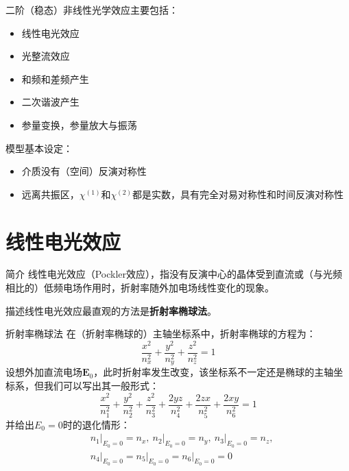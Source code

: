 \documentclass{beamer}
\renewcommand{\bm}{\symbf}
\newenvironment{slide}{
    \begin{frame}{\bfseries{\sectiontitle}}
}{
    \end{frame}
}
\let\sectiononly\section
\renewcommand{\section}[1]{
    \sectiononly{#1}
    \let\sectiontitle\relax
    \newcommand{\sectiontitle}{#1}
}
\begin{document}
\begin{slide}

    二阶（稳态）非线性光学效应主要包括：
    \begin{itemize}
    \item 线性电光效应
    \item 光整流效应
    \item 和频和差频产生
    \item 二次谐波产生
    \item 参量变换，参量放大与振荡
    \end{itemize}

    \vspace{1em}

    模型基本设定：
    \begin{itemize}
    \item 介质没有（空间）反演对称性
    \item 远离共振区，$\chi^{(1)}$和$\chi^{(2)}$都是实数，具有完全对易对称性和时间反演对称性
    \end{itemize}

\end{slide}

\section{线性电光效应}

\begin{slide}{简介}
    线性电光效应（Pockler效应），指没有反演中心的晶体受到直流或（与光频相比的）低频电场作用时，折射率随外加电场线性变化的现象。
    \bigskip

    描述线性电光效应最直观的方法是\textbf{折射率椭球法}。
\end{slide}

\begin{slide}{折射率椭球法}
    在（折射率椭球的）主轴坐标系中，折射率椭球的方程为：
    \[
        \frac{x^2}{n_x^2} + \frac{y^2}{n_y^2} + \frac{z^2}{n_z^2} = 1
    \]
    设想外加直流电场$\bm{E}_0$，此时折射率发生改变，该坐标系不一定还是椭球的主轴坐标系，但我们可以写出其一般形式：
    \[
        \frac{x^2}{n_1^2} + \frac{y^2}{n_2^2} + \frac{z^2}{n_3^2} + \frac{2yz}{n_4^2} + \frac{2zx}{n_5^2} + \frac{2xy}{n_6^2} = 1
    \]
    并给出$E_0=0$时的退化情形：
    \begin{align*}
        &n_1\big|_{E_0 = 0} = n_x,\
        n_2\big|_{E_0 = 0} = n_y,\
        n_3\big|_{E_0 = 0} = n_z,\\
        &n_4\big|_{E_0 = 0} =
        n_5\big|_{E_0 = 0} =
        n_6\big|_{E_0 = 0} = 0
    \end{align*}
\end{slide}
\end{document}
